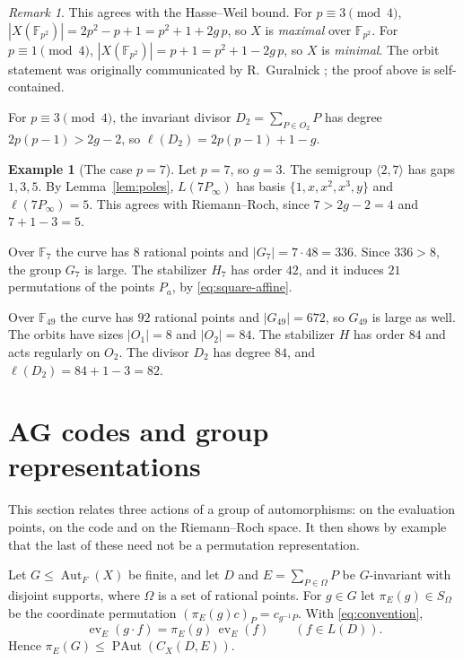 \documentclass[12pt,letterpaper]{article}
\theoremstyle{definition}
\newtheorem{example}[theorem]{Example}
\theoremstyle{remark}
\newtheorem{remark}[theorem]{Remark}
\numberwithin{equation}{section}
\newcommand{\F}{\mathbb{F}}
\newcommand{\Aut}{\operatorname{Aut}}
\newcommand{\ev}{\operatorname{ev}}
\newcommand{\PAut}{\operatorname{PAut}}
\begin{document}
\begin{remark}
This agrees with the Hasse--Weil bound.  For $p\equiv3\pmod4$,
$|X(\F_{p^2})|=2p^2-p+1=p^2+1+2g\,p$, so $X$ is \emph{maximal} over
$\F_{p^2}$.  For $p\equiv1\pmod4$, $|X(\F_{p^2})|=p+1=p^2+1-2g\,p$, so
$X$ is \emph{minimal}.  The orbit statement was originally communicated
by R.~Guralnick \cite{Gu04}; the proof above is self-contained.
\end{remark}

For $p\equiv3\pmod4$, the invariant divisor $D_2=\sum_{P\in O_2}P$ has
degree $2p(p-1)>2g-2$, so $\ell(D_2)=2p(p-1)+1-g$.

\begin{example}[The case $p=7$]\label{ex:curve-p7}
Let $p=7$, so $g=3$. The semigroup $\langle2,7\rangle$ has gaps $1,3,5$.
By Lemma~\ref{lem:poles}, $L(7P_\infty)$ has basis $\{1,x,x^2,x^3,y\}$
and $\ell(7P_\infty)=5$. This agrees with Riemann--Roch, since
$7>2g-2=4$ and $7+1-3=5$.

Over $\F_7$ the curve has $8$ rational points and $|G_7|=7\cdot48=336$.
Since $336>8$, the group $G_7$ is large. The stabilizer $H_7$ has order
$42$, and it induces $21$ permutations of the points $P_a$, by
\eqref{eq:square-affine}.

Over $\F_{49}$ the curve has $92$ rational points and $|G_{49}|=672$, so
$G_{49}$ is large as well. The orbits have sizes $|O_1|=8$ and
$|O_2|=84$. The stabilizer $H$ has order $84$ and acts regularly on
$O_2$. The divisor $D_2$ has degree $84$, and $\ell(D_2)=84+1-3=82$.
\end{example}

\section{AG codes and group representations}\label{sec:modules}

This section relates three actions of a group of automorphisms: on the
evaluation points, on the code and on the Riemann--Roch space. It then
shows by example that the last of these need not be a permutation
representation.

Let $G\le\Aut_F(X)$ be finite, and let $D$ and $E=\sum_{P\in\Omega}P$ be
$G$-invariant with disjoint supports, where $\Omega$ is a set of rational
points.  For $g\in G$ let $\pi_E(g)\in S_\Omega$ be the coordinate
permutation $(\pi_E(g)c)_P=c_{g^{-1}P}$.  With \eqref{eq:convention},
\begin{equation}\label{eq:equivariance}
\ev_E(g\cdot f)=\pi_E(g)\,\ev_E(f)\qquad(f\in L(D)).
\end{equation}
Hence $\pi_E(G)\le\PAut(C_X(D,E))$.
\end{document}
